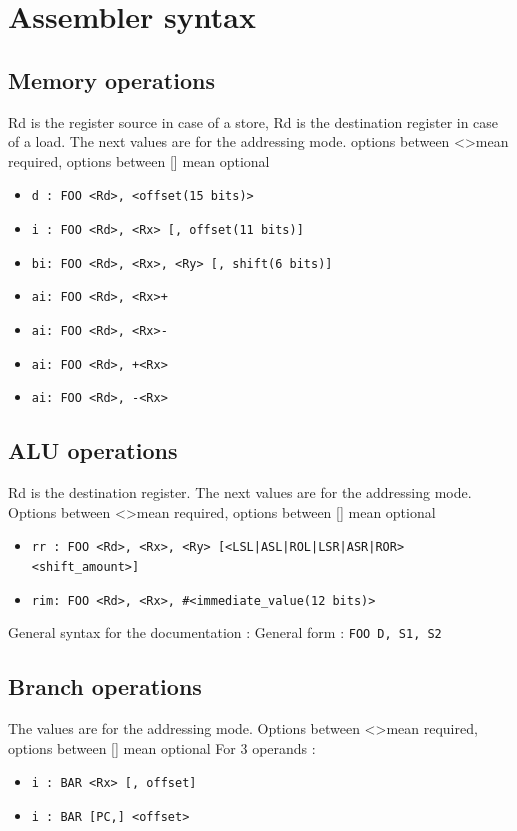 \documentclass[11pt]{article}
\begin{document}
\newpage
\section{Assembler syntax}
\subsection{Memory operations}
Rd is the register source in case of a store, Rd is the destination register
in case of a load. The next values are for the addressing mode.
options between \textless \textgreater mean required, options between [] mean optional
\begin{itemize}
    \item \texttt{d : FOO <Rd>, <offset(15 bits)> }
    \item \texttt{i : FOO <Rd>, <Rx> [, offset(11 bits)] }
    \item \texttt{bi: FOO <Rd>, <Rx>, <Ry> [, shift(6 bits)]}
    \item \texttt{ai: FOO <Rd>, <Rx>+}
    \item \texttt{ai: FOO <Rd>, <Rx>-}
    \item \texttt{ai: FOO <Rd>, +<Rx>}
    \item \texttt{ai: FOO <Rd>, -<Rx>}
\end{itemize}
\subsection{ALU operations}
Rd is the destination register. The next values are for the addressing mode.
Options between \textless \textgreater mean required, options between [] mean
optional

\begin{itemize}
    \item \texttt{rr : FOO <Rd>, <Rx>, <Ry> [<LSL|ASL|ROL|LSR|ASR|ROR>
        <shift\_amount>]}
    \item \texttt{rim: FOO <Rd>, <Rx>, \#<immediate\_value(12
        bits)>}
\end{itemize}
General syntax for the documentation :
\newline
General form : \texttt{FOO D, S1, S2}

\subsection{Branch operations}
The values are for the addressing mode.
Options between \textless \textgreater mean required, options between [] mean
optional
For 3 operands : 
\begin{itemize}
    \item \texttt{i : BAR <Rx> [, offset]}
    \item \texttt{i : BAR [PC,] <offset>}
\end{itemize}
\end{document}

